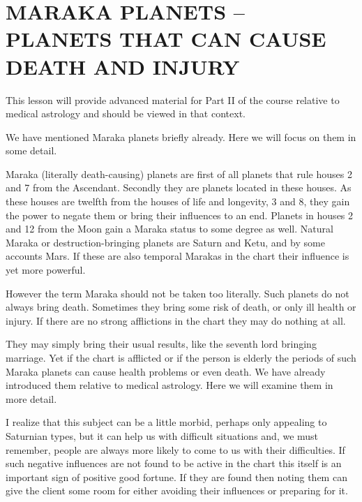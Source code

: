 \section{MARAKA PLANETS – PLANETS THAT CAN CAUSE DEATH AND INJURY}
 

This lesson will provide advanced material for Part II of the course relative to medical astrology and should be viewed in that context.

 

We have mentioned Maraka planets briefly already. Here we will focus on them in some detail.

 

Maraka (literally death-causing) planets are first of all planets that rule houses 2 and 7 from the Ascendant. Secondly they are planets located in these houses. As these houses are twelfth from the houses of life and longevity, 3 and 8, they gain the power to negate them or bring their influences to an end. Planets in houses 2 and 12 from the Moon gain a Maraka status to some degree as well. Natural Maraka or destruction-bringing planets are Saturn and Ketu, and by some accounts Mars. If these are also temporal Marakas in the chart their influence is yet more powerful.

 

However the term Maraka should not be taken too literally. Such planets do not always bring death. Sometimes they bring some risk of death, or only ill health or injury. If there are no strong afflictions in the chart they may do nothing at all.

 

They may simply bring their usual results, like the seventh lord bringing marriage. Yet if the chart is afflicted or if the person is elderly the periods of such Maraka planets can cause health problems or even death. We have already introduced them relative to medical astrology. Here we will examine them in more detail.

 

I realize that this subject can be a little morbid, perhaps only appealing to Saturnian types, but it can help us with difficult situations and, we must remember, people are always more likely to come to us with their difficulties. If such negative influences are not found to be active in the chart this itself is an important sign of positive good fortune. If they are found then noting them can give the client some room for either avoiding their influences or preparing for it.

 

